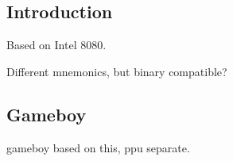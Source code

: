 
\subsection{Introduction}

Based on Intel 8080.

Different mnemonics, but binary compatible?

\subsection{Gameboy}
gameboy based on this, ppu separate.
